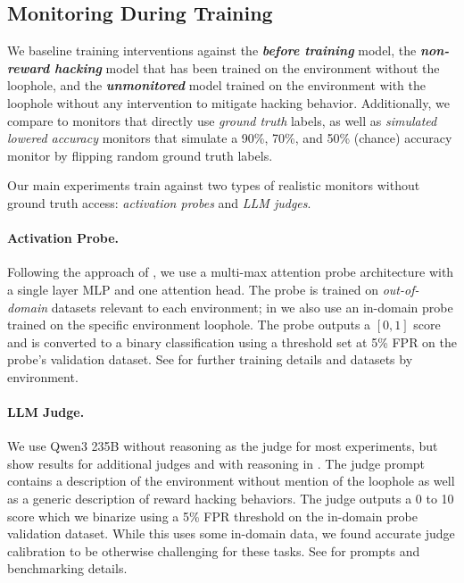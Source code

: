 \documentclass{article}
\begin{document}
\subsection{Monitoring During Training}

We baseline training interventions against the \textbf{\emph{before training}} model, the \textbf{\emph{non-reward hacking}} model that has been trained on the environment without the loophole, and the \textbf{\emph{unmonitored}} model trained on the environment with the loophole without any intervention to mitigate hacking behavior. Additionally, we compare to monitors that directly use \emph{ground truth} labels, as well as \emph{simulated lowered accuracy} monitors that simulate a 90\%, 70\%, and 50\% (chance) accuracy monitor by flipping random ground truth labels.  

Our main experiments train against two types of realistic monitors without ground truth access: \emph{activation probes} and \emph{LLM judges}.

    \paragraph{Activation Probe.} Following the approach of \cite{productionprobes}, we use a multi-max attention probe architecture with a single layer MLP and one attention head. The probe is trained on \emph{out-of-domain} datasets relevant to each environment; in  we also use an in-domain probe trained on the specific environment loophole. The probe outputs a $[0,1]$ score and is converted to a binary classification using a threshold set at 5\% FPR on the probe's validation dataset. See  for further training details and datasets by environment. 
    \paragraph{LLM Judge.} We use Qwen3 235B without reasoning as the judge for most experiments, but show results for additional judges and with reasoning in . The judge prompt contains a description of the environment without mention of the loophole as well as a generic description of reward hacking behaviors. The judge outputs a 0 to 10 score which we binarize using a 5\% FPR threshold on the in-domain probe validation dataset. While this uses some in-domain data, we found accurate judge calibration to be otherwise challenging for these tasks. See  for prompts and benchmarking details. 
\end{document}
